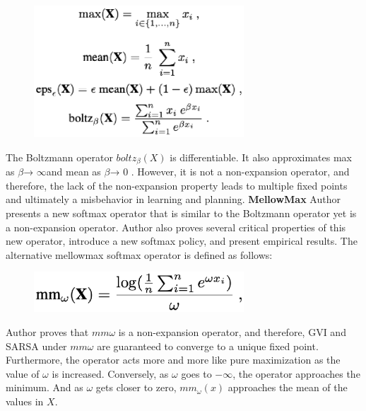 \begin{figure}[H] %
\centering %
\includegraphics[width=0.7\textwidth]{algorithm.eps} %

\end{figure}
The Boltzmann operator $boltz_{\beta}(X)$ is differentiable. It also approximates max as $\beta $→ $\infty$and mean as $\beta $→ $0$ . However, it is not a non-expansion operator, and therefore, the lack of the non-expansion property leads to multiple fixed points and ultimately a misbehavior in learning and planning.
\newpage
\textbf{MellowMax}
\newline\newline
Author presents a new softmax operator that is similar to the Boltzmann operator yet is a non-expansion operator. Author also proves several critical properties of this new operator, introduce a new softmax policy, and present empirical results. The alternative mellowmax softmax operator is defined as follows:
\begin{figure}[H] %
\centering %
\includegraphics[width=0.7\textwidth]{mel.eps} %

\end{figure}

Author proves that $mm\omega$ is a non-expansion operator, and therefore, GVI and SARSA under $mm\omega$ are guaranteed to converge to a unique fixed point.
Furthermore, the operator acts more and more like pure maximization as the value of $\omega$ is increased. Conversely, as $\omega$ goes to $-\infty$, the operator approaches the minimum.
And as ${\omega}$ gets closer to zero, $mm_{\omega}(x)$ approaches the
mean of the values in $X$.


